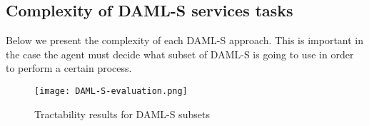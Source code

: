 \subsection*{Complexity of DAML-S services tasks}
Below we present the complexity of each DAML-S approach. This is important in the case the agent must decide what subset of DAML-S is going to use in order to perform a certain process.
\begin{figure}[H]
    \centering
    \texttt{[image: DAML-S-evaluation.png]}
    \caption{Tractability results for DAML-S subsets}
    \label{fig:Conditional effects and outputs}
\end{figure}